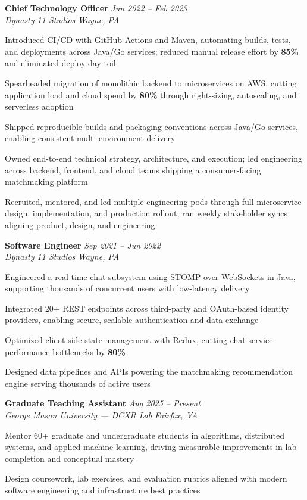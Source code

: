 \documentclass[letterpaper,10pt]{article}
\newcommand{\role}[4]{%
  \textbf{#1} \hfill \textit{#3}\\[-1pt]
  \textit{#2} \hfill \textit{#4}\par\vspace{2pt}
}
\begin{document}
\role{Chief Technology Officer}{Dynasty 11 Studios}{Jun 2022 -- Feb 2023}{Wayne, PA}
\begin{tightitemize}
  \item Introduced CI/CD with GitHub Actions and Maven, automating builds, tests, and deployments across Java/Go services; reduced manual release effort by \textbf{85\%} and eliminated deploy-day toil
  \item Spearheaded migration of monolithic backend to microservices on AWS, cutting application load and cloud spend by \textbf{80\%} through right-sizing, autoscaling, and serverless adoption
  \item Shipped reproducible builds and packaging conventions across Java/Go services, enabling consistent multi-environment delivery
  \item Owned end-to-end technical strategy, architecture, and execution; led engineering across backend, frontend, and cloud teams shipping a consumer-facing matchmaking platform
  \item Recruited, mentored, and led multiple engineering pods through full microservice design, implementation, and production rollout; ran weekly stakeholder syncs aligning product, design, and engineering
\end{tightitemize}

\role{Software Engineer}{Dynasty 11 Studios}{Sep 2021 -- Jun 2022}{Wayne, PA}
\begin{tightitemize}
  \item Engineered a real-time chat subsystem using STOMP over WebSockets in Java, supporting thousands of concurrent users with low-latency delivery
  \item Integrated 20+ REST endpoints across third-party and OAuth-based identity providers, enabling secure, scalable authentication and data exchange
  \item Optimized client-side state management with Redux, cutting chat-service performance bottlenecks by \textbf{80\%}
  \item Designed data pipelines and APIs powering the matchmaking recommendation engine serving thousands of active users
\end{tightitemize}

\role{Graduate Teaching Assistant}{George Mason University --- DCXR Lab}{Aug 2025 -- Present}{Fairfax, VA}
\begin{tightitemize}
  \item Mentor 60+ graduate and undergraduate students in algorithms, distributed systems, and applied machine learning, driving measurable improvements in lab completion and conceptual mastery
  \item Design coursework, lab exercises, and evaluation rubrics aligned with modern software engineering and infrastructure best practices
\end{tightitemize}
\end{document}
